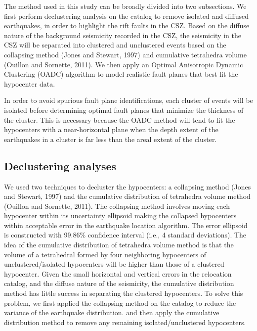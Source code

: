 \documentclass[draft]{agujournal2018}
\begin{document}
The method used in this study can be broadly divided into two subsections. We first perform declustering analysis on the catalog to remove isolated and diffused earthquakes, in order to highlight the rift faults in the CSZ. Based on the diffuse nature of the background seismicity recorded in the CSZ, the seismicity in the CSZ will be separated into clustered and unclustered events based on the collapsing method (Jones and Stewart, 1997) and cumulative tetrahedra volume (Ouillon and Sornette, 2011). We then apply an Optimal Anisotropic Dynamic Clustering (OADC) algorithm to model realistic fault planes that best fit the hypocenter data. 

In order to avoid spurious fault plane identifications, each cluster of events will be isolated before determining optimal fault planes that minimize the thickness of the cluster. This is necessary because the OADC method will tend to fit the hypocenters with a near-horizontal plane when the depth extent of the earthquakes in a cluster is far less than the areal extent of the cluster. 


\subsection{Declustering analyses}
We used two techniques to decluster the hypocenters: a collapsing method (Jones and Stewart, 1997) and the cumulative distribution of tetrahedra volume method (Ouillon and Sornette, 2011). The collapsing method involves moving each hypocenter within its uncertainty ellipsoid making the collapsed hypocenters within acceptable error in the earthquake location algorithm. The error ellipsoid is constructed with 99.86\% confidence interval (i.e., 4 standard deviations). The idea of the cumulative distribution of tetrahedra volume method is that the volume of a tetrahedral formed by four neighboring hypocenters of unclustered/isolated hypocenters will be higher than those of a clustered hypocenter. Given the small horizontal and vertical errors in the relocation catalog, and the diffuse nature of the seismicity, the cumulative distribution method has little success in separating the clustered hypocenters. To solve this problem, we first applied the collapsing method on the catalog to reduce the variance of the earthquake distribution. and then apply the cumulative distribution method to remove any remaining isolated/unclustered hypocenters.
 
\end{document}
